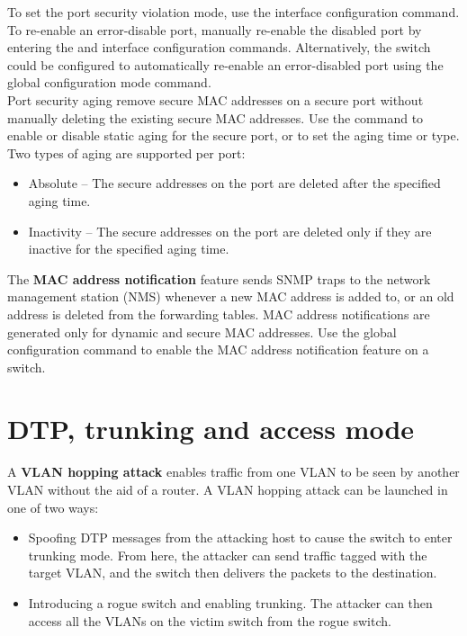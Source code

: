 To set the port security violation mode, use the  interface configuration command. To re-enable an error-disable port, manually re-enable the disabled port by entering the  and  interface configuration commands. Alternatively, the switch could be configured to automatically re-enable an error-disabled port using the  global configuration mode command.\\

Port security aging  remove secure MAC addresses on a secure port without manually deleting the existing secure MAC addresses. Use the  command to enable or disable static aging for the secure port, or to set the aging time or type. Two types of aging are supported per port:

\begin{itemize}
\item Absolute -- The secure addresses on the port are deleted after the specified aging time.
\item Inactivity -- The secure addresses on the port are deleted only if they are inactive for the specified aging time.
\end{itemize}

The \textbf{MAC address notification} feature sends SNMP traps to the network management station (NMS) whenever a new MAC address is added to, or an old address is deleted from the forwarding tables. MAC address notifications are generated only for dynamic and secure MAC addresses. Use the  global configuration command to enable the MAC address notification feature on a switch.

\section{DTP, trunking and access mode}

A \textbf{VLAN hopping attack} enables traffic from one VLAN to be seen by another VLAN without the aid of a router. A VLAN hopping attack can be launched in one of two ways:

\begin{itemize}
\item Spoofing DTP messages from the attacking host to cause the switch to enter trunking mode. From here, the attacker can send traffic tagged with the target VLAN, and the switch then delivers the packets to the destination.
\item Introducing a rogue switch and enabling trunking. The attacker can then access all the VLANs on the victim switch from the rogue switch.
\end{itemize}

